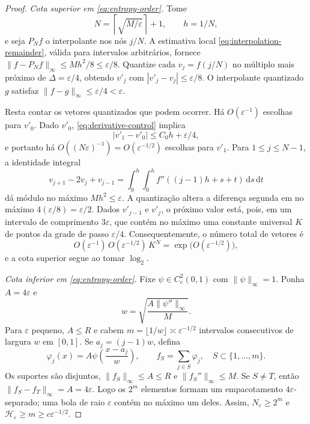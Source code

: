 \documentclass[11pt,a4paper]{article}
\theoremstyle{definition}
\theoremstyle{remark}
\newcommand{\dd}{\,\mathrm{d}}
\begin{document}
\begin{proof}
\emph{Cota superior em \eqref{eq:entropy-order}.} Tome
\[
 N=\left\lceil\sqrt{M/\varepsilon}\right\rceil+1,\qquad h=1/N,
\]
e seja $P_Nf$ o interpolante nos nós $j/N$. A estimativa local \eqref{eq:interpolation-remainder}, válida para intervalos arbitrários, fornece $\|f-P_Nf\|_\infty\le Mh^2/8\le\varepsilon/8$. Quantize cada $v_j=f(j/N)$ no múltiplo mais próximo de $\Delta=\varepsilon/4$, obtendo $v'_j$ com $|v'_j-v_j|\le\varepsilon/8$. O interpolante quantizado $g$ satisfaz $\|f-g\|_\infty\le\varepsilon/4<\varepsilon$.

Resta contar os vetores quantizados que podem ocorrer. Há $O(\varepsilon^{-1})$ escolhas para $v'_0$. Dado $v'_0$, \eqref{eq:derivative-control} implica
\[
 |v'_1-v'_0|\le C_0h+\varepsilon/4,
\]
e portanto há $O((N\varepsilon)^{-1})=O(\varepsilon^{-1/2})$ escolhas para $v'_1$. Para $1\le j\le N-1$, a identidade integral
\[
 v_{j+1}-2v_j+v_{j-1}
 =\int_0^h\int_0^h
 f''((j-1)h+s+t)\dd s\dd t
\]
dá módulo no máximo $Mh^2\le\varepsilon$. A quantização altera a diferença segunda em no máximo $4(\varepsilon/8)=\varepsilon/2$. Dados $v'_{j-1}$ e $v'_j$, o próximo valor está, pois, em um intervalo de comprimento $3\varepsilon$, que contém no máximo uma constante universal $K$ de pontos da grade de passo $\varepsilon/4$. Consequentemente, o número total de vetores é
\[
 O(\varepsilon^{-1})\,O(\varepsilon^{-1/2})\,K^N
 =\exp\bigl(O(\varepsilon^{-1/2})\bigr),
\]
e a cota superior segue ao tomar $\log_2$.

\emph{Cota inferior em \eqref{eq:entropy-order}.} Fixe $\psi\in C_c^2(0,1)$ com $\|\psi\|_\infty=1$. Ponha $A=4\varepsilon$ e
\[
 w=\sqrt{\frac{A\|\psi''\|_\infty}{M}}.
\]
Para $\varepsilon$ pequeno, $A\le R$ e cabem $m=\lfloor1/w\rfloor\asymp\varepsilon^{-1/2}$ intervalos consecutivos de largura $w$ em $[0,1]$. Se $a_j=(j-1)w$, defina
\[
 \varphi_j(x)=A\psi\!\left(\frac{x-a_j}{w}\right),\qquad
 f_S=\sum_{j\in S}\varphi_j,\quad S\subset\{1,\ldots,m\}.
\]
Os suportes são disjuntos, $\|f_S\|_\infty\le A\le R$ e $\|f_S''\|_\infty\le M$. Se $S\neq T$, então $\|f_S-f_T\|_\infty=A=4\varepsilon$. Logo os $2^m$ elementos formam um empacotamento $4\varepsilon$-separado; uma bola de raio $\varepsilon$ contém no máximo um deles. Assim, $N_\varepsilon\ge2^m$ e $\mathcal{H}_\varepsilon\ge m\ge c\varepsilon^{-1/2}$.


\end{proof}
\end{document}
